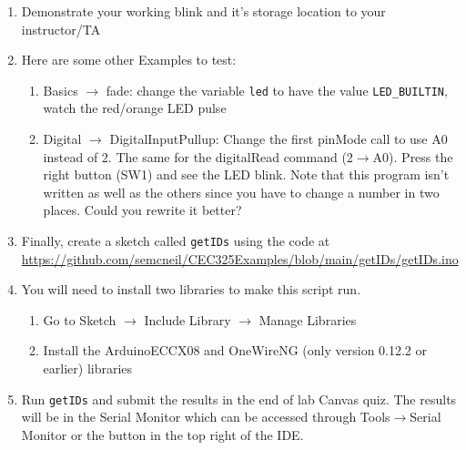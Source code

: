 \begin{enumerate}
	\item Demonstrate your working blink and it's storage location to your instructor/TA
	\item Here are some other Examples to test:
	\begin{enumerate}
		\item Basics $\rightarrow$ fade: change the variable \lstinline|led| to have the value 
            \lstinline|LED_BUILTIN|, watch the red/orange LED pulse
		\item Digital $\rightarrow$ DigitalInputPullup: Change the first pinMode call to use A0 instead of 2. The same for 
				the digitalRead command (2$\rightarrow$A0). Press the right button (SW1) and see the LED blink. 
				 Note that this program isn't written as well as the others since you have to change a number in two
				places. Could you rewrite it better?
	\end{enumerate}
    \item Finally, create a sketch called \lstinline$getIDs$ using the code at \\ 
        \href{https://github.com/semcneil/CEC325Examples/blob/main/getIDs/getIDs.ino}{https://github.com/semcneil/CEC325Examples/blob/main/getIDs/getIDs.ino}
    \item You will need to install two libraries to make this script run.
    \begin{enumerate}
        \item Go to Sketch $\rightarrow$ Include Library $\rightarrow$ Manage Libraries 
        \item Install the ArduinoECCX08 and OneWireNG (only version 0.12.2 or earlier) libraries
    \end{enumerate}
    \item Run \lstinline$getIDs$ and submit the results in the end of lab Canvas quiz. The results will be 
                in the Serial Monitor which can be accessed through Tools$\rightarrow$Serial Monitor or the 
                button in the top right of the IDE.
\end{enumerate}



